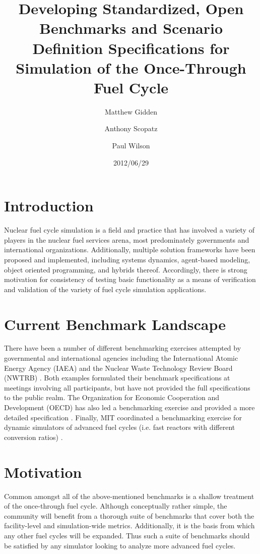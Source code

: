 \documentclass{anstrans}
\title{Developing Standardized, Open Benchmarks and Scenario 
Definition Specifications for Simulation of the Once-Through Fuel 
Cycle}
\author[*]{Matthew Gidden}
\author[$\dag$]{Anthony Scopatz}
\author[*]{Paul Wilson}
\affil[*]{Department of Nuclear Engineering \& Engineering Physics, 
University of Wisconsin - Madison, Madison, WI, 53703}
\affil[$\dag$]{The Flash Center for Computational Science, University 
of Chicago, Chicago, IL, 60637}
\date{2012/06/29}
\begin{document}
\section{Introduction}
Nuclear fuel cycle simulation is a field and practice that has 
involved a variety of players in the nuclear fuel services arena, most
predominately governments and international organizations. 
Additionally, multiple solution frameworks have been proposed and 
implemented, including systems dynamics, agent-based modeling, object 
oriented programming, and hybrids thereof. Accordingly, there is 
strong motivation for consistency of testing basic functionality as a
means of verification and validation of the variety of fuel cycle
simulation applications.

\section{Current Benchmark Landscape}
There have been a number of different benchmarking exercises attempted by
governmental and international agencies including the International Atomic
Energy Agency (IAEA) \cite{_international_2011} and the Nuclear Waste Technology
Review Board (NWTRB) \cite{_nuclear_2011}.  Both examples formulated their
benchmark specifications at meetings involving all participants, but have not
provided the full specifications to the public realm. The Organization for
Economic Cooperation and Development (OECD) has also led a benchmarking exercise
\cite{boucher_benchmark_2012} and provided a more detailed specification
\cite{boucher_specification_2008}. Finally, MIT coordinated a benchmarking
exercise for dynamic simulators of advanced fuel cycles (i.e. fast reactors with
different conversion ratios) \cite{guerin_benchmark_2009}.

\section{Motivation}
Common amongst all of the above-mentioned benchmarks is a shallow
treatment of the once-through fuel cycle. Although conceptually 
rather simple, the community will benefit from a thorough suite of 
benchmarks that cover both the facility-level and simulation-wide 
metrics. Additionally, it is the basis from which any other fuel 
cycles will be expanded.  Thus such a suite of benchmarks should be 
satisfied by any simulator looking to analyze more advanced fuel 
cycles.
\end{document}
